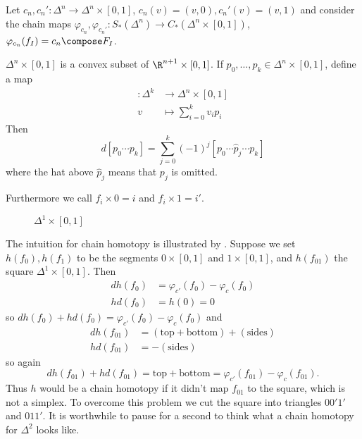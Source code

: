 \documentclass[a4paper]{article}
\begin{document}
Let \(c_n, c_n': \Delta^n \to \Delta^n \times [0, 1]\), \(c_n(v) = (v, 0), c_n'(v) = (v, 1)\) and consider the chain maps \(\varphi_{c_n}, \varphi_{c_n'}: S_*(\Delta^n) \to C_*(\Delta^n \times [0, 1])\), \(\varphi_{c_n}(f_I) = c_n \compose F_I\).

\begin{notation}
  \(\Delta^n \times [0, 1]\) is a convex subset of \(\R^{n + 1} \times [0, 1]\). If \(p_0, \dots, p_k \in \Delta^n \times [0, 1]\), define a map
  \begin{align*}
    [p_0 \cdots p_k]: \Delta^k &\to \Delta^n \times [0, 1] \\
    v &\mapsto \sum_{i = 0}^k v_i p_i
  \end{align*}
  Then
  \[
    d[p_0 \cdots p_k] = \sum_{j = 0}^k (-1)^j [p_0 \cdots \hat p_j \cdots p_k]
  \]
  where the hat above \(\hat p_j\) means that \(p_j\) is omitted.

  Furthermore we call \(f_i \times 0 = i\) and \(f_i \times 1 = i'\).
\end{notation}

\begin{figure}[ht]
  \centering
  \def\svgwidth{.8\columnwidth}
  
  \caption{\(\Delta^1 \times [0, 1]\)}
  \label{fig:chain homotopy}
\end{figure}

The intuition for chain homotopy is illustrated by . Suppose we set \(h(f_0), h(f_1)\) to be the segments \(0 \times [0, 1]\) and \(1 \times [0, 1]\), and \(h(f_{01})\) the square \(\Delta^1 \times [0, 1]\). Then
\begin{align*}
  dh(f_0) &= \varphi_{c'}(f_0) - \varphi_c(f_0) \\
  hd(f_0) &= h(0) = 0
\end{align*}
so \(dh(f_0) + hd(f_0) = \varphi_{c'}(f_0) - \varphi_c(f_0)\) and
\begin{align*}
  dh(f_{01}) &= (\text{top} + \text{bottom}) + (\text{sides}) \\
  hd(f_{01}) &= - (\text{sides})
\end{align*}
so again
\[
  dh(f_{01}) + hd(f_{01}) = \text{top} + \text{bottom} = \varphi_{c'}(f_{01}) - \varphi_c(f_{01}).
\]
Thus \(h\) would be a chain homotopy if it didn't map \(f_{01}\) to the square, which is not a simplex. To overcome this problem we cut the square into triangles \(00'1'\) and \(011'\). It is worthwhile to pause for a second to think what a chain homotopy for \(\Delta^2\) looks like.
\end{document}
